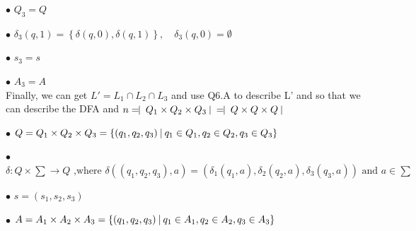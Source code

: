 \documentclass[12pt,a4paper]{article}
\begin{document}
	$\bullet$ $Q_3 = Q$

	$\bullet$ $\delta_3(q,1) = \left\{ \delta(q,0),\delta(q,1) \right\}, \quad \delta_3(q,0) = \emptyset $

	$\bullet$ $s_3 = s$

	$\bullet$ $A_3 = A$\\
	
	Finally, we can get $L' = L_1 \cap L_2 \cap L_3$ and use Q6.A to describe L' and so that we can describe the DFA and $n= \vline\ Q_1 \times Q_2 \times Q_3 \   \vline\ = \vline\ Q \times Q \times Q \ \vline\ $
	
	$\bullet$ $Q = Q_1 \times Q_2 \times Q_3 = \{(q_1,q_2,q_3)\ \vline\ q_1 \in Q_1, q_2 \in Q_2, q_3 \in Q_3\}$

	$\bullet$ $\delta:Q \times \sum \rightarrow Q \mbox{ ,where } \delta((q_1,q_2,q_3),a) = (\delta_1(q_1,a),\delta_2(q_2,a),\delta_3(q_3,a)) \mbox{ and } a \in \sum$

	$\bullet$ $s = (s_1,s_2,s_3)$

	$\bullet$ $A = A_1 \times A_2 \times A_3 = \{(q_1,q_2,q_3)\ \vline\ q_1 \in A_1, q_2 \in A_2, q_3 \in A_3\}$
\end{document}
